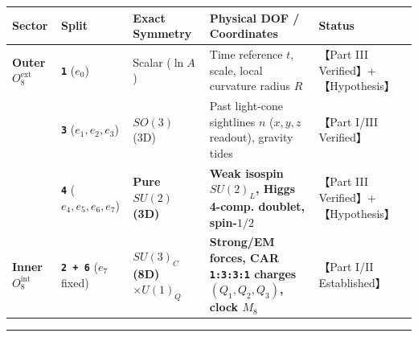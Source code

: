 \documentclass[
  a4paper,
]{article}
\newcounter{none} %
\begin{document}
{\def\LTcaptype{none} %
\begin{longtable}[]{@{}
  >{\raggedright\arraybackslash}p{}
  >{\raggedright\arraybackslash}p{}
  >{\raggedright\arraybackslash}p{}
  >{\raggedright\arraybackslash}p{}
  >{\raggedright\arraybackslash}p{}@{}}
\toprule\noalign{}
\begin{minipage}[b]{\linewidth}\raggedright
Sector
\end{minipage} & \begin{minipage}[b]{\linewidth}\raggedright
Split
\end{minipage} & \begin{minipage}[b]{\linewidth}\raggedright
Exact Symmetry
\end{minipage} & \begin{minipage}[b]{\linewidth}\raggedright
Physical DOF / Coordinates
\end{minipage} & \begin{minipage}[b]{\linewidth}\raggedright
Status
\end{minipage} \\
\midrule\noalign{}
\endhead
\bottomrule\noalign{}
\endlastfoot
\textbf{Outer \(O_8^{\mathrm{ext}}\)} & \textbf{\texttt{1}} (\(e_0\)) &
Scalar (\(\ln A\)) & Time reference \(t\), scale, local curvature radius
\(R\) & 【Part III Verified】+【Hypothesis】 \\
& \textbf{\texttt{3}} (\(e_1,e_2,e_3\)) & \(SO(3)\) (3D) & Past
light-cone sightlines \(n\) (\(x,y,z\) readout), gravity tides & 【Part
I/III Verified】 \\
& \textbf{\texttt{4}} (\(e_4,e_5,e_6,e_7\)) & \textbf{Pure \(SU(2)\)
(3D)} & \textbf{Weak isospin \(SU(2)_L\), Higgs 4-comp. doublet,
spin-\(1/2\)} & 【Part III Verified】+【Hypothesis】 \\
\textbf{Inner \(O_8^{\mathrm{int}}\)} & \textbf{\texttt{2\ +\ 6}}
(\(e_7\) fixed) & \textbf{\(SU(3)_C\) (8D) \(\times U(1)_Q\)} &
\textbf{Strong/EM forces, CAR \texttt{1:3:3:1} charges
\((Q_1,Q_2,Q_3)\), clock \(M_8\)} & 【Part I/II Established】 \\
\end{longtable}
}

\begin{center}\rule{0.5\linewidth}{0.5pt}\end{center}
\end{document}
